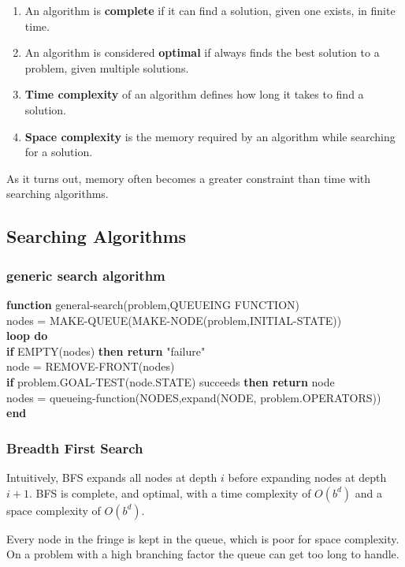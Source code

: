 \documentclass{chezarticle}
\begin{document}
\begin{definition}
\begin{enumerate}
\item An algorithm is \textbf{complete} if it can find a solution, given one exists, in finite time.
\item An algorithm is considered \textbf{optimal} if always finds the best solution to a problem, given multiple solutions.
\item \textbf{Time complexity} of an algorithm defines how long it takes to find a solution.
\item \textbf{Space complexity} is the memory required by an algorithm while searching for a solution.
\end{enumerate}

\end{definition}
As it turns out, memory often becomes a greater constraint than time with searching algorithms. 
\subsection{Searching Algorithms}
\subsubsection{generic search algorithm}
\begin{algorithm}
\textbf{function} general-search(problem,QUEUEING FUNCTION)\\
nodes = MAKE-QUEUE(MAKE-NODE(problem,INITIAL-STATE))\\
\textbf{loop do}\\
\textbf{if} EMPTY(nodes) \textbf{then return} "failure"\\
node = REMOVE-FRONT(nodes)\\
\textbf{if} problem.GOAL-TEST(node.STATE) succeeds \textbf{then return} node\\
nodes = queueing-function(NODES,expand(NODE, problem.OPERATORS))\\
\textbf{end}
\end{algorithm}

\subsubsection{Breadth First Search}
\begin{algorithm}
Intuitively, BFS expands all nodes at depth $i$ before expanding nodes at depth $i+1$. BFS is complete, and optimal, with a time complexity of $O(b^d)$ and a space complexity of $O(b^d)$.
\end{algorithm}
Every node in the fringe is kept in the queue, which is poor for space complexity. On a problem with a high branching factor the queue can get too long to handle. 
\end{document}
